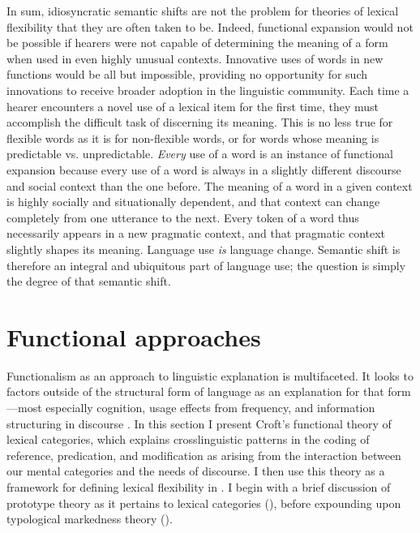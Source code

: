 In sum, idiosyncratic semantic shifts are not the problem for theories of lexical flexibility that they are often taken to be. Indeed, functional expansion would not be possible if hearers were not capable of determining the meaning of a form when used in even highly unusual contexts. Innovative uses of words in new functions would be all but impossible, providing no opportunity for such innovations to receive broader adoption in the linguistic community. Each time a hearer encounters a novel use of a lexical item for the first time, they must accomplish the difficult task of discerning its meaning. This is no less true for flexible words as it is for non-flexible words, or for words whose meaning is predictable vs. unpredictable. \emph{Every} use of a word is an instance of functional expansion because every use of a word is always in a slightly different discourse and social context than the one before. The meaning of a word in a given context is highly socially and situationally dependent, and that context can change completely from one utterance to the next. Every token of a word thus necessarily appears in a new pragmatic context, and that pragmatic context slightly shapes its meaning. Language use \emph{is} language change. Semantic shift is therefore an integral and ubiquitous part of language use; the question is simply the degree of that semantic shift.

\section{Functional approaches}
\label{sec:2.4}

Functionalism as an approach to linguistic explanation is multifaceted. It looks to factors outside of the structural form of language as an explanation for that form—most especially cognition, usage effects from frequency, and information structuring in discourse \parencite[6323--6324]{Croft2001a}. In this section I present Croft's \parencites*{Croft1991}{Croft2000}{Croft2001b} functional theory of lexical categories, which explains crosslinguistic patterns in the coding of reference, predication, and modification as arising from the interaction between our mental categories and the needs of discourse. I then use this theory as a framework for defining lexical flexibility in . I begin with a brief discussion of prototype theory as it pertains to lexical categories (), before expounding upon typological markedness theory ().

